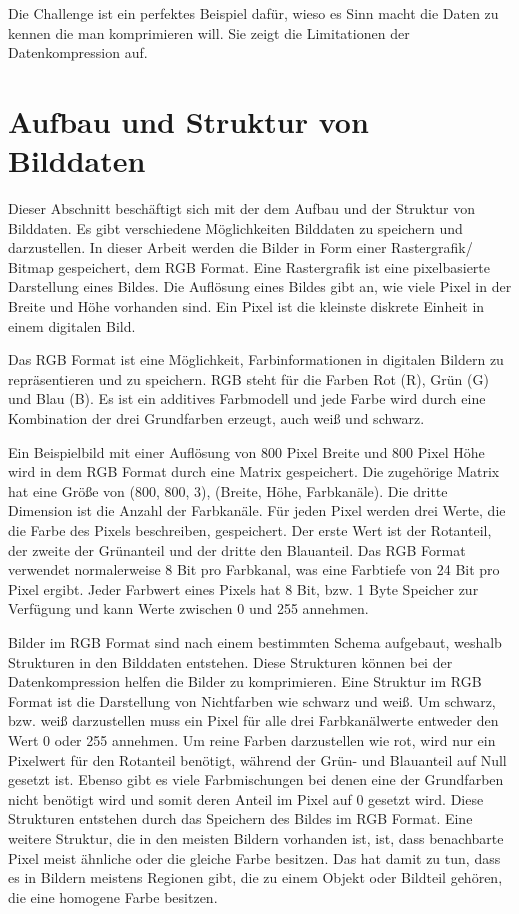 \documentclass[conference]{IEEEtran}
\begin{document}
Die Challenge ist ein perfektes Beispiel dafür, wieso es Sinn macht die Daten zu
kennen die man komprimieren will.
Sie zeigt die Limitationen der Datenkompression auf.


\section{Aufbau und Struktur von Bilddaten}

Dieser Abschnitt beschäftigt sich mit der dem Aufbau und der Struktur von Bilddaten.
Es gibt verschiedene Möglichkeiten Bilddaten zu speichern und darzustellen.
In dieser Arbeit werden die Bilder in Form einer Rastergrafik/ Bitmap gespeichert, dem
RGB Format.
Eine Rastergrafik ist eine pixelbasierte Darstellung eines Bildes.
Die Auflösung eines Bildes gibt an, wie viele Pixel in der Breite und Höhe vorhanden sind.
Ein Pixel ist die kleinste diskrete Einheit in einem digitalen Bild.

Das RGB Format ist eine Möglichkeit, Farbinformationen in digitalen Bildern zu
repräsentieren und zu speichern.
RGB steht für die Farben Rot (R), Grün (G) und Blau (B).
Es ist ein additives Farbmodell und jede Farbe wird durch eine Kombination
der drei Grundfarben erzeugt, auch weiß und schwarz. \cite{rite}

Ein Beispielbild mit einer Auflösung von 800 Pixel Breite und 800 Pixel Höhe wird in
dem RGB Format durch eine Matrix gespeichert.
Die zugehörige Matrix hat eine Größe von (800, 800, 3), (Breite, Höhe, Farbkanäle).
Die dritte Dimension ist die Anzahl der Farbkanäle.
Für jeden Pixel werden drei Werte, die die Farbe des Pixels beschreiben, gespeichert.
Der erste Wert ist der Rotanteil, der zweite der Grünanteil und der dritte
den Blauanteil.
Das RGB Format verwendet normalerweise 8 Bit pro Farbkanal, was eine Farbtiefe von
24 Bit pro Pixel ergibt.
Jeder Farbwert eines Pixels hat 8 Bit, bzw. 1 Byte Speicher zur Verfügung und kann
Werte zwischen 0 und 255 annehmen.

Bilder im RGB Format sind nach einem bestimmten Schema aufgebaut, weshalb
Strukturen in den Bilddaten entstehen.
Diese Strukturen können bei der Datenkompression helfen die Bilder zu komprimieren.
Eine Struktur im RGB Format ist die Darstellung von Nichtfarben
wie schwarz und weiß.
Um schwarz, bzw. weiß darzustellen muss ein Pixel für alle drei Farbkanälwerte entweder
den Wert 0 oder 255 annehmen.
Um reine Farben darzustellen wie rot, wird nur ein Pixelwert für den Rotanteil
benötigt, während der Grün- und Blauanteil auf Null gesetzt ist.
Ebenso gibt es viele Farbmischungen bei denen eine der Grundfarben nicht benötigt
wird und somit deren Anteil im Pixel auf 0 gesetzt wird.
Diese Strukturen entstehen durch das Speichern des Bildes im RGB Format.
Eine weitere Struktur, die in den meisten Bildern vorhanden ist, ist, dass benachbarte
Pixel meist ähnliche oder die gleiche Farbe besitzen.
Das hat damit zu tun, dass es in Bildern meistens Regionen gibt, die zu einem
Objekt oder Bildteil gehören, die eine homogene Farbe besitzen.
\end{document}
